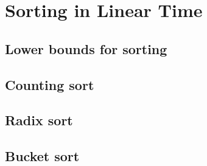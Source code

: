 \section{Sorting in Linear Time}
\subsection{Lower bounds for sorting}
\subsection{Counting sort}
\subsection{Radix sort}
\subsection{Bucket sort}
